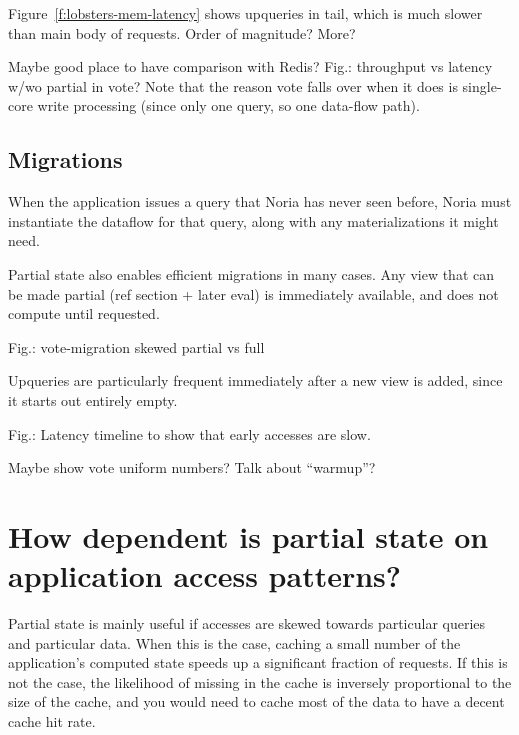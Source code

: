 \begin{inprogress}
Figure~\ref{f:lobsters-mem-latency} shows upqueries in tail, which is much
slower than main body of requests. Order of magnitude? More?
\end{inprogress}


\begin{inprogress}
Maybe good place to have comparison with Redis?
Fig.: throughput vs latency w/wo partial in vote?
Note that the reason vote falls over when it does is single-core write
processing (since only one query, so one data-flow path).
\end{inprogress}

\subsection{Migrations}
\label{s:eval:cost:mig}

When the application issues a query that Noria has never seen before, Noria must
instantiate the dataflow for that query, along with any materializations it
might need.

Partial state also enables efficient migrations in many cases. Any view
that can be made partial (ref section + later eval) is immediately
available, and does not compute until requested.

Fig.: vote-migration skewed partial vs full

Upqueries are particularly frequent immediately after a new view is added, since
it starts out entirely empty.

Fig.: Latency timeline to show that early accesses are slow.

\begin{inprogress}
Maybe show vote uniform numbers? Talk about ``warmup''?
\end{inprogress}

\section{How dependent is partial state on application access patterns?}
\label{s:eval:patterns}

Partial state is mainly useful if accesses are skewed towards particular queries
and particular data. When this is the case, caching a small number of the
application's computed state speeds up a significant fraction of requests. If
this is not the case, the likelihood of missing in the cache is inversely
proportional to the size of the cache, and you would need to cache most of the
data to have a decent cache hit rate.

